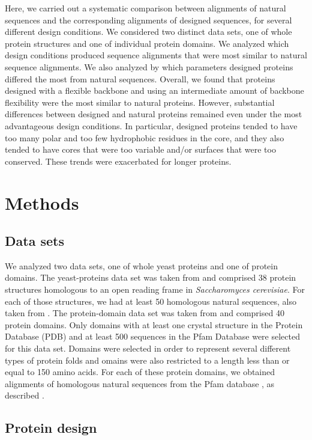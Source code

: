 \documentclass[12pt]{article}
\begin{document}
Here, we carried out a systematic comparison between alignments of natural sequences and the corresponding alignments of designed sequences, for several different design conditions. We considered two distinct data sets, one of whole protein structures and one of individual protein domains. We analyzed which design conditions produced sequence alignments that were most similar to natural sequence alignments. We also analyzed by which parameters designed proteins differed the most from natural sequences. Overall, we found that proteins designed with a flexible backbone and using an intermediate amount of backbone flexibility were the most similar to natural proteins. However, substantial differences between designed and natural proteins remained even under the most advantageous design conditions. In particular, designed proteins tended to have too many polar and too few hydrophobic residues in the core, and they also tended to have cores that were too variable and/or surfaces that were too conserved. These trends were exacerbated for longer proteins.


\section{Methods}
\label{Methods}

\subsection{Data sets}

We analyzed two data sets, one of whole yeast proteins and one of protein domains. The yeast-proteins data set was taken from \citet{Ramsey2011} and comprised 38 protein structures homologous to an open reading frame in \emph{Saccharomyces cerevisiae}. For each of those structures, we had at least 50 homologous natural sequences, also taken from  \citet{Ramsey2011}. The protein-domain data set was taken from \citet{OllikainenKortemme} and comprised 40 protein domains. Only domains with at least one crystal structure in the Protein Database (PDB) and at least 500 sequences in the Pfam Database were selected for this data set. Domains were selected in order to represent several different types of protein folds and omains were also restricted to a length less than or equal to 150 amino acids. For each of these protein domains, we obtained alignments of homologous natural sequences from the Pfam database \citep{Pfam}, as described \citep{OllikainenKortemme}.

\subsection{Protein design}
\end{document}
